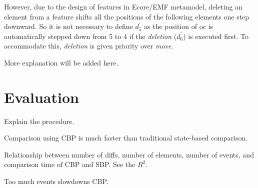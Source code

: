 \documentclass{llncs}
\begin{document}
However, due to the design of features in Ecore/EMF metamodel, deleting an element from a feature shifts all the positions of the following elements one step downward. So it is not necessary to define $d_5^\prime$ as the position of \textsf{oc} is automatically stepped down from 5 to 4 if the \textit{deletion} ($d_6^\prime$) is executed first. To accommodate this, \textit{deletion} is given priority over \textit{move}. 

More explanation will be added here.

\section{Evaluation}
\label{sec:evaluation}

Explain the procedure.

Comparison using CBP is much faster than traditional state-based comparison.

Relationship between number of diffs, number of elements, number of events, and comparison time of CBP and SBP. See the $R^2$.

Too much events slowdowns CBP.
 
\end{document}
